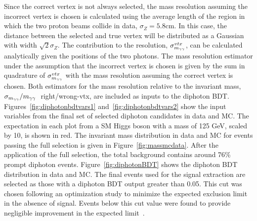 Since the correct vertex is not always selected, the mass resolution assuming the incorrect vertex is chosen
is calculated using the average length of the region in which the two proton beams collide in data, $\sigma_{Z}=5.8$cm. In this case, the distance 
between the selected and true vertex will be distributed as a Gaussian with width $\sqrt{2}\sigma_{Z}$.
The contribution to the resolution, $\sigma_{m_{\gamma\gamma}}^{vtx}$, can be calculated analytically given the positions of
the two photons. The mass resolution estimator under the assumption that the incorrect vertex is chosen is 
given by the sum in quadrature of $\sigma_{m_{\gamma\gamma}}^{vtx}$ with the mass resolution assuming the correct vertex is chosen.
Both estimators for the mass resolution relative to the invariant mass, $\sigma_{m_{\gamma\gamma}}/m_{\gamma\gamma}~$ right/wrong-vtx, 
are included as inputs to the diphoton BDT.  
Figures~\ref{fig:diphotonbdtvars1} and~\ref{fig:diphotonbdtvars2} show the input variables from the 
final set of selected diphoton candidates in data and MC. 
The expectation in each plot from a SM Higgs boson with a mass of 125 GeV, scaled by 10, is shown in red. 
The invariant mass distribution in data and MC for events passing the full
selection is given in Figure~\ref{fig:massmcdata}. After the application of the full selection, 
the total background contains around 76\% prompt diphoton events.
Figure~\ref{fig:diphotonBDT} shows the diphoton BDT distribution in data and MC.
The final events used for the signal extraction are selected as those with a diphoton BDT output greater than 0.05. 
This cut was chosen following an optimization study to minimize the expected exclusion limit in the absence of signal.
Events below this cut value were found to provide negligible improvement in the expected limit~\citep{AN-12-048}.

